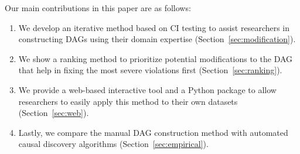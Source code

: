 \documentclass{uai2025} %
\begin{document}
% 
% 

Our main contributions in this paper are as follows:

\begin{enumerate}
    \item We develop an iterative method based on CI testing to assist researchers in 
	    constructing DAGs using their domain expertise (Section~\ref{sec:modification}).
    \item We show a ranking method to prioritize potential modifications to the DAG that 
    	    help in fixing the most severe violations first (Section~\ref{sec:ranking}).
    \item We provide a web-based interactive tool and a Python package to allow 
	    researchers to easily apply this method to their own datasets (Section~\ref{sec:web}).
    \item Lastly, we compare the manual DAG construction method with automated
	    causal discovery algorithms (Section~\ref{sec:empirical}).
\end{enumerate}
\end{document}
